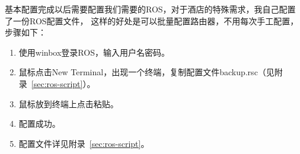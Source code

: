 基本配置完成以后需要配置我们需要的ROS，对于酒店的特殊需求，我自己配置了一份ROS配置文件，
这样的好处是可以批量配置路由器，不用每次手工配置，步骤如下：
\begin{enumerate}
\item 使用winbox登录ROS，输入用户名密码。
\item 鼠标点击New Terminal，出现一个终端，复制配置文件backup.rsc（见附录~\ref{sec:ros-script}）。
\item 鼠标放到终端上点击粘贴。
\item 配置成功。
\item 配置文件详见附录~\ref{sec:ros-script}。
\end{enumerate}




